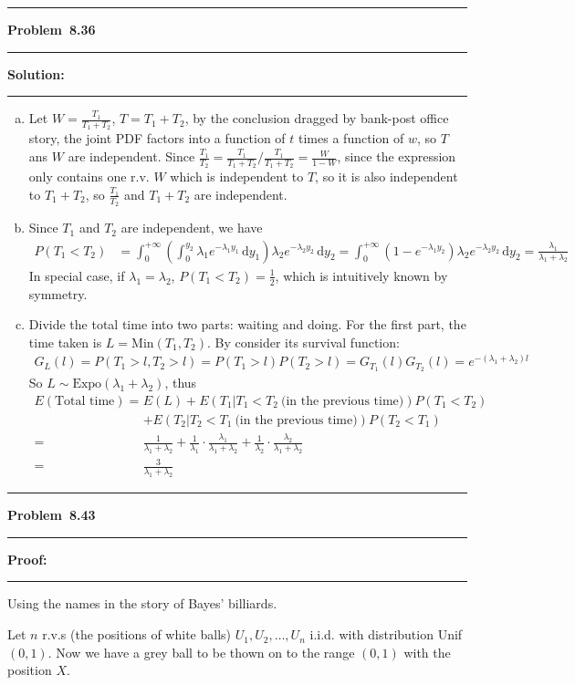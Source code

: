 \documentclass[10.5pt]{article}
\newcommand\question[1]{\vspace{.2in}\hrule\vspace{0.04in}\textbf{Problem\ #1}\vspace{.4em}\hrule\vspace{.10in}}
\newcommand\Solution{\vspace{.3in}\textbf{Solution:}\vspace{.5em}\hrule\vspace{.08in}\par}
\newcommand\Proof{\vspace{.3in}\textbf{Proof:}\vspace{.5em}\hrule\vspace{.08in}\par}
\begin{document}
\question{8.36}
\Solution{}
\begin{enumerate}[(a)]
	\item Let $W = \frac{T_1}{T_1+T_2}$, $T = T_1+T_2$, by the conclusion dragged by bank-post office story, the joint PDF factors into a function of $t$ times a function of $w$, so $T$ ans $W$ are independent. Since $\frac{T_1}{T_2} = \frac{T_1}{T_1+T_2}/\frac{T_1}{T_1+T_2} = \frac{W}{1-W}$, since the expression only contains one r.v. $W$ which is independent to $T$, so it is also independent to $T_1+T_2$, so $\frac{T_1}{T_2}$ and $T_1+T_2$ are independent.\vspace{1cm}
	\item Since $T_1$ and $T_2$ are independent, we have  
	\begin{align*}
		P(T_1<T_2) &= \int_0^{+\infty}\left(\int_0^{y_2}\lambda_1e^{-\lambda_1y_1}\,\mathrm{d}y_1\right)\lambda_2e^{-\lambda_2y_2}\,\mathrm{d}y_2=\int_0^{+\infty}(1-e^{-\lambda_1 y_2})\lambda_2e^{-\lambda_2y_2}\,\mathrm{d}y_2= \frac{\lambda_1}{\lambda_1+\lambda_2}
	\end{align*}
	In special case, if $\lambda_1 = \lambda_2$, $P(T_1<T_2) = \frac{1}{2}$, which is intuitively known by symmetry.
\vspace{1cm}
	\item Divide the total time into two parts: waiting and doing. For the first part, the time taken is $L = \text{Min}(T_1, T_2)$. By consider its survival function:
	\begin{align*}
		G_L(l) = P(T_1 > l, T_2 > l) = P(T_1 > l)P(T_2 > l) = G_{T_1}(l)G_{T_2}(l) = e^{-(\lambda_1+\lambda_2)l}
	\end{align*}
	So $L\sim\text{Expo}(\lambda_1+\lambda_2)$,
	thus \begin{align*}
		E(\text{Total time}) =& E(L) + E(T_1|T_1<T_2\ \text{(in the previous time)})P(T_1<T_2)\\&+E(T_2|T_2<T_1\ \text{(in the previous time)})P(T_2<T_1)\\[8pt]
		=& \frac{1}{\lambda_1+\lambda_2}+\frac{1}{\lambda_1}\cdot\frac{\lambda_1}{\lambda_1+\lambda_2}+\frac{1}{\lambda_2}\cdot\frac{\lambda_2}{\lambda_1+\lambda_2}\\[8pt]
		=&\frac{3}{\lambda_1+\lambda_2}
	\end{align*}
\end{enumerate}


\pagebreak
\question{8.43}
\Proof{}
Using the names in the story of Bayes' billiards.

Let $n$ r.v.s (the positions of white balls) $U_1, U_2, \dots, U_n$ i.i.d. with distribution Unif$(0, 1)$. Now we have a grey ball to be thown on to the range $(0, 1)$ with the position $X$.
\vspace{0.4cm}
\end{document}
